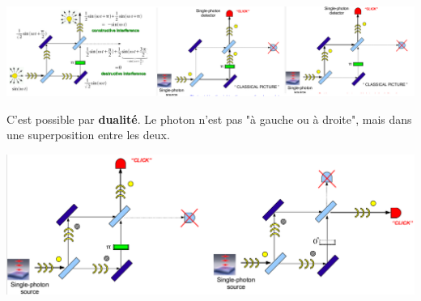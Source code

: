 \begin{center}
	\includegraphics[scale=0.25]{ch1/image5.png}
\end{center}

C'est possible par \textbf{dualité}. Le photon n'est pas "à gauche ou à droite", mais dans une
superposition entre les deux.
\begin{center}
	\includegraphics[scale=0.3]{ch1/image6.png}
\end{center}

\newpage
